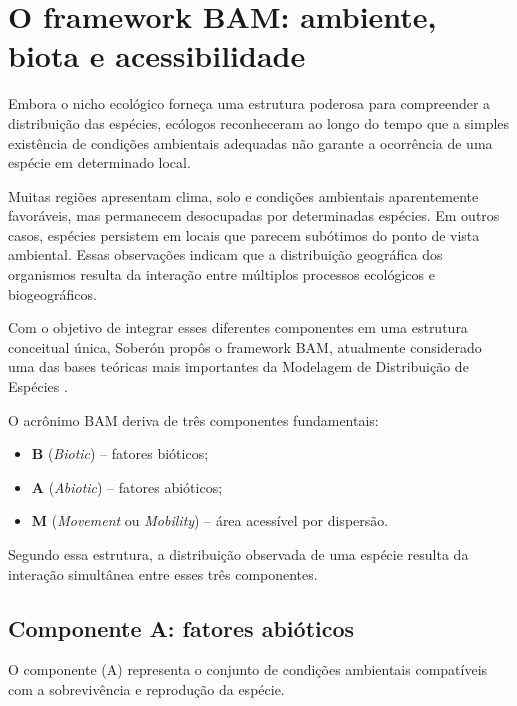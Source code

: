 \section{O framework BAM: ambiente, biota e acessibilidade}

Embora o nicho ecológico forneça uma estrutura poderosa para compreender a distribuição das espécies, ecólogos reconheceram ao longo do tempo que a simples existência de condições ambientais adequadas não garante a ocorrência de uma espécie em determinado local.

Muitas regiões apresentam clima, solo e condições ambientais aparentemente favoráveis, mas permanecem desocupadas por determinadas espécies. Em outros casos, espécies persistem em locais que parecem subótimos do ponto de vista ambiental. Essas observações indicam que a distribuição geográfica dos organismos resulta da interação entre múltiplos processos ecológicos e biogeográficos.

Com o objetivo de integrar esses diferentes componentes em uma estrutura conceitual única, Soberón propôs o framework BAM, atualmente considerado uma das bases teóricas mais importantes da Modelagem de Distribuição de Espécies \parencite{soberon2005,soberon2007,soberon2009}.

O acrônimo BAM deriva de três componentes fundamentais:

\begin{itemize}
	
	\item \textbf{B} (\textit{Biotic}) -- fatores bióticos;
	
	\item \textbf{A} (\textit{Abiotic}) -- fatores abióticos;
	
	\item \textbf{M} (\textit{Movement} ou \textit{Mobility}) -- área acessível por dispersão.
	
\end{itemize}

Segundo essa estrutura, a distribuição observada de uma espécie resulta da interação simultânea entre esses três componentes.

\subsection{Componente A: fatores abióticos}

O componente (A) representa o conjunto de condições ambientais compatíveis com a sobrevivência e reprodução da espécie.

